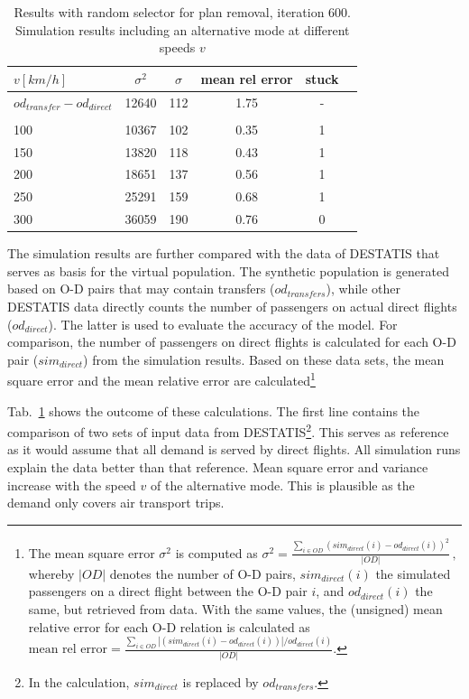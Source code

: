 \begin{table}[t]
\centering
		\begin{tabular}{@{}l|ccccc@{}}
			$v [km/h]$ & $\sigma^2$ & $\sigma$ & mean rel error  & stuck \\
\hline
 $od_{transfer} - od_{direct}$ &  12640 & 112 & 1.75 & - \\
 \\
 100	& 10367 & 102 & %
 0.35%
 &  %
 1
 \\	%
 150	& 13820 & 118 & 0.43 &  1 \\	%
 200 & 18651 & 137 & 0.56 &  1 \\	%
 250 & 25291 & 159 & 0.68 & 1 \\	%
 300 & 36059 & 190 & 0.76 & 0 \\	%
		\end{tabular}
		\caption{Results with random selector for plan removal, iteration 600. Simulation results including an alternative mode at different speeds $v$}
		\label{tab:2009_results_alternative_mode_psl}
\end{table}

The simulation results are further compared with the data of DESTATIS that serves as basis for the virtual population.  
The synthetic population is generated based on O-D pairs that may contain transfers ($od_{transfers}$), 
while other DESTATIS data directly counts the number of passengers on actual direct flights ($od_{direct}$). %
The latter is used to evaluate the accuracy of the model.
For comparison, the number of passengers on direct flights is calculated for each O-D pair ($sim_{direct}$) from the simulation results.
Based on these data sets, the mean square error and the mean relative error are calculated\footnote{
The mean square error $\sigma^2$ is computed as
	$\sigma^2 = \frac{\sum_{i \in OD} (sim_{direct}(i) - od_{direct}(i))^2}{|OD|} \, , $
whereby $|OD|$ denotes the number of O-D pairs, $sim_{direct}(i)$ the simulated passengers on a direct flight between the O-D pair $i$, and $od_{direct}(i)$ the same, but retrieved from data.  
With the same values, the (unsigned) mean relative error for each O-D relation is calculated as
$
\mbox{mean rel error} = \frac{\sum_{i \in OD} |(sim_{direct}(i) - od_{direct}(i))|/ od_{direct}(i)}{|OD|}.
$
}

Tab.~\ref{tab:2009_results_alternative_mode_psl} shows the outcome of these calculations. 
The first line contains the comparison of two sets of input data from DESTATIS\footnote{In the calculation, $sim_{direct}$ is replaced by $od_{transfers}$.}. 
This serves as reference as it would assume that all demand is served by direct flights.
All simulation runs explain the data better than that reference.
Mean square error and variance increase with the speed $v$ of the alternative mode.  
This is plausible as the demand only covers air transport trips. 


